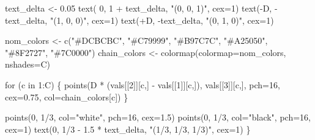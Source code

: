 \documentclass[
  letterpaper,
  DIV=11,
  numbers=noendperiod]{scrartcl}
\newenvironment{Shaded}{\begin{snugshade}}{\end{snugshade}}
\newcommand{\AttributeTok}[1]{\textcolor[rgb]{0.40,0.45,0.13}{#1}}
\newcommand{\ControlFlowTok}[1]{\textcolor[rgb]{0.00,0.23,0.31}{#1}}
\newcommand{\DecValTok}[1]{\textcolor[rgb]{0.68,0.00,0.00}{#1}}
\newcommand{\FloatTok}[1]{\textcolor[rgb]{0.68,0.00,0.00}{#1}}
\newcommand{\FunctionTok}[1]{\textcolor[rgb]{0.28,0.35,0.67}{#1}}
\newcommand{\NormalTok}[1]{\textcolor[rgb]{0.00,0.23,0.31}{#1}}
\newcommand{\OtherTok}[1]{\textcolor[rgb]{0.00,0.23,0.31}{#1}}
\newcommand{\SpecialCharTok}[1]{\textcolor[rgb]{0.37,0.37,0.37}{#1}}
\newcommand{\StringTok}[1]{\textcolor[rgb]{0.13,0.47,0.30}{#1}}
\begin{document}
\begin{Shaded}
\begin{Highlighting}[]
\NormalTok{  text\_delta }\OtherTok{\textless{}{-}} \FloatTok{0.05}
  \FunctionTok{text}\NormalTok{( }\DecValTok{0}\NormalTok{, }\DecValTok{1} \SpecialCharTok{+}\NormalTok{ text\_delta, }\StringTok{"(0, 0, 1)"}\NormalTok{, }\AttributeTok{cex=}\DecValTok{1}\NormalTok{)}
  \FunctionTok{text}\NormalTok{(}\SpecialCharTok{{-}}\NormalTok{D, }\SpecialCharTok{{-}}\NormalTok{text\_delta, }\StringTok{"(1, 0, 0)"}\NormalTok{, }\AttributeTok{cex=}\DecValTok{1}\NormalTok{)}
  \FunctionTok{text}\NormalTok{(}\SpecialCharTok{+}\NormalTok{D, }\SpecialCharTok{{-}}\NormalTok{text\_delta, }\StringTok{"(0, 1, 0)"}\NormalTok{, }\AttributeTok{cex=}\DecValTok{1}\NormalTok{)}

\NormalTok{  nom\_colors }\OtherTok{\textless{}{-}} \FunctionTok{c}\NormalTok{(}\StringTok{"\#DCBCBC"}\NormalTok{, }\StringTok{"\#C79999"}\NormalTok{, }\StringTok{"\#B97C7C"}\NormalTok{,}
                  \StringTok{"\#A25050"}\NormalTok{, }\StringTok{"\#8F2727"}\NormalTok{, }\StringTok{"\#7C0000"}\NormalTok{)}
\NormalTok{  chain\_colors }\OtherTok{\textless{}{-}} \FunctionTok{colormap}\NormalTok{(}\AttributeTok{colormap=}\NormalTok{nom\_colors, }\AttributeTok{nshades=}\NormalTok{C)}

  \ControlFlowTok{for}\NormalTok{ (c }\ControlFlowTok{in} \DecValTok{1}\SpecialCharTok{:}\NormalTok{C) \{}
    \FunctionTok{points}\NormalTok{(D }\SpecialCharTok{*}\NormalTok{ (vals[[}\DecValTok{2}\NormalTok{]][c,] }\SpecialCharTok{{-}}\NormalTok{ vals[[}\DecValTok{1}\NormalTok{]][c,]), vals[[}\DecValTok{3}\NormalTok{]][c,],}
           \AttributeTok{pch=}\DecValTok{16}\NormalTok{, }\AttributeTok{cex=}\FloatTok{0.75}\NormalTok{, }\AttributeTok{col=}\NormalTok{chain\_colors[c])}
\NormalTok{  \}}

  \FunctionTok{points}\NormalTok{(}\DecValTok{0}\NormalTok{, }\DecValTok{1}\SpecialCharTok{/}\DecValTok{3}\NormalTok{, }\AttributeTok{col=}\StringTok{"white"}\NormalTok{, }\AttributeTok{pch=}\DecValTok{16}\NormalTok{, }\AttributeTok{cex=}\FloatTok{1.5}\NormalTok{)}
  \FunctionTok{points}\NormalTok{(}\DecValTok{0}\NormalTok{, }\DecValTok{1}\SpecialCharTok{/}\DecValTok{3}\NormalTok{, }\AttributeTok{col=}\StringTok{"black"}\NormalTok{, }\AttributeTok{pch=}\DecValTok{16}\NormalTok{, }\AttributeTok{cex=}\DecValTok{1}\NormalTok{)}
  \FunctionTok{text}\NormalTok{(}\DecValTok{0}\NormalTok{, }\DecValTok{1}\SpecialCharTok{/}\DecValTok{3} \SpecialCharTok{{-}} \FloatTok{1.5} \SpecialCharTok{*}\NormalTok{ text\_delta, }\StringTok{"(1/3, 1/3, 1/3)"}\NormalTok{, }\AttributeTok{cex=}\DecValTok{1}\NormalTok{)}
\NormalTok{\}}
\end{Highlighting}
\end{Shaded}
\end{document}
